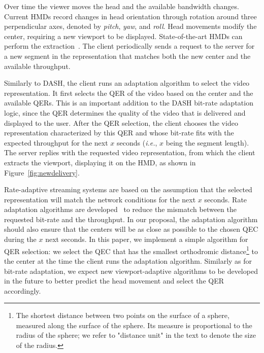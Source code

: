 Over time the viewer moves the head and the
available bandwidth changes. Current \acp{HMD} record changes
in head orientation through rotation around three perpendicular axes,
denoted by \emph{pitch}, \emph{yaw}, and \emph{roll}.
Head movements modify the \FoV{} center, requiring a new viewport
to be displayed. State-of-the-art \acp{HMD} can perform the
extraction~\cite{fovhmds}. The client periodically sends a request
to the server for a new segment in the representation that
matches both the new \FoV{} center and the available throughput.

Similarly to \ac{DASH}, the client runs
an adaptation algorithm to select the video representation. It first
selects the \ac{QER} of the video based on the \FoV{} center and
the available \acp{QER}. This is an important addition to
the \ac{DASH} bit-rate adaptation logic, since the \ac{QER} determines
the quality of the video that is delivered and displayed to the user.
After the \ac{QER} selection, the client chooses the video
representation characterized by this \ac{QER} and whose bit-rate fits
with the expected throughput for the next $x$ seconds (\textit{i.e.},
$x$ being the segment length). The server replies
with the requested video representation, from which the
client extracts the viewport, displaying it on the \ac{HMD}, as
shown in Figure~\ref{fig:newdelivery}.

Rate-adaptive streaming systems are based on the assumption that
the selected representation will match the network
conditions for the next $x$ seconds. Rate adaptation algorithms
are
developed~\cite{tian,probe_li_2014,miller,zou,liu} to reduce the mismatch between the
requested bit-rate and the throughput. In our proposal, the adaptation algorithm should also ensure
that the \FoV{} centers will be as close as possible to the chosen \ac{QEC} during
the $x$ next seconds.
In this paper, we implement
a simple algorithm for \ac{QER} selection: we select the \ac{QEC} that
has the smallest orthodromic distance\footnote{The shortest distance
between two points on the surface of a sphere, measured along the
surface of the sphere. Its measure is proportional to the radius
of the sphere; we refer to "distance unit" in the text to denote the
size of the radius.} to the \FoV{} center at the time the client runs
the adaptation algorithm. Similarly as for bit-rate adaptation, we
expect new viewport-adaptive algorithms to be developed in
the future to better predict the head movement and select the
\ac{QER} accordingly.

